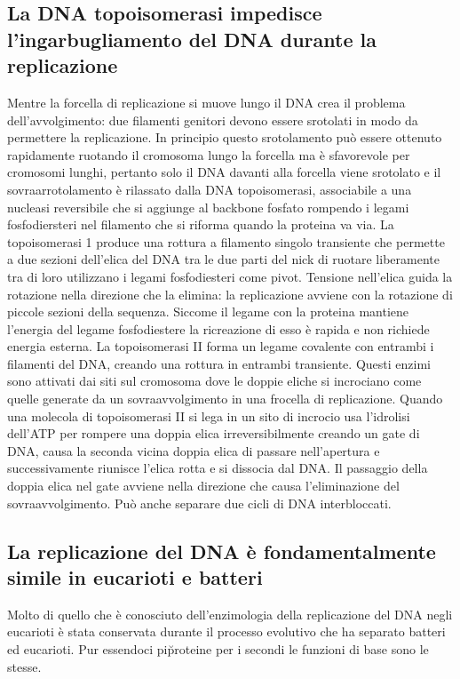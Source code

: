 \subsection{La DNA topoisomerasi impedisce l'ingarbugliamento del DNA durante la replicazione}
Mentre la forcella di replicazione si muove lungo il DNA crea il problema dell'avvolgimento: due filamenti genitori devono essere srotolati in modo da permettere la replicazione. In 
principio questo srotolamento pu\`o essere ottenuto rapidamente ruotando il cromosoma lungo la forcella ma \`e sfavorevole per cromosomi lunghi, pertanto solo il DNA davanti alla 
forcella viene srotolato e il sovraarrotolamento \`e rilassato dalla DNA topoisomerasi, associabile a una nucleasi reversibile che si aggiunge al backbone fosfato rompendo i legami
fosfodiersteri nel filamento che si riforma quando la proteina va via. La topoisomerasi 1 produce una rottura a filamento singolo transiente che permette a due sezioni dell'elica del DNA
tra le due parti del nick di ruotare liberamente tra di loro utilizzano i legami fosfodiesteri come pivot. Tensione nell'elica guida la rotazione nella direzione che la elimina: la
replicazione avviene con la rotazione di piccole sezioni della sequenza. Siccome il legame con la proteina mantiene l'energia del legame fosfodiestere la ricreazione di esso \`e rapida
e non richiede energia esterna. La topoisomerasi II forma un legame covalente con entrambi i filamenti del DNA, creando una rottura in entrambi transiente. Questi enzimi sono attivati 
dai siti sul cromosoma dove le doppie eliche si incrociano come quelle generate da un sovraavvolgimento in una frocella di replicazione. Quando una molecola di topoisomerasi II si lega 
in un sito di incrocio usa l'idrolisi dell'ATP per rompere una doppia elica irreversibilmente creando un gate di DNA, causa la seconda vicina doppia elica di passare nell'apertura e 
successivamente riunisce l'elica rotta e si dissocia dal DNA. Il passaggio della doppia elica nel gate avviene nella direzione che causa l'eliminazione del sovraavvolgimento. Pu\`o 
anche separare due cicli di DNA interbloccati. 
\subsection{La replicazione del DNA \`e fondamentalmente simile in eucarioti e batteri}
Molto di quello che \`e conosciuto dell'enzimologia della replicazione del DNA negli eucarioti  \`e stata conservata durante il processo evolutivo che ha separato batteri ed eucarioti. 
Pur essendoci pi\u proteine per i secondi le funzioni di base sono le stesse. 
